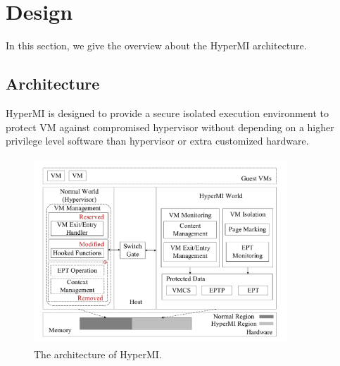 \documentclass[conference]{IEEEtran}
\begin{document}

\section{Design}
In this section, we give the overview about the HyperMI architecture.%


\subsection{Architecture} 

HyperMI is designed to provide a secure isolated execution environment to protect VM against compromised hypervisor without depending on a higher privilege level software than hypervisor or extra customized hardware.

\begin{figure}
\centerline{\includegraphics[width=9.5cm, height=7cm]{pdfvmcs1.pdf}}%
\caption{The architecture of HyperMI. } \label{fig1}
\end{figure}
\end{document}
